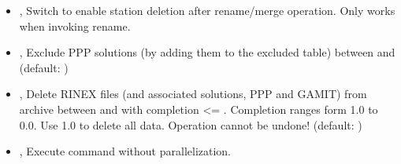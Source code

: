 \documentclass[letterpaper,10pt,english]{sphinxmanual}
\begin{document}
\begin{itemize}
\item {} 
\sphinxAtStartPar
{\hyperref[\detokenize{com:IntegrityCheck.py--del_stn}]{}}, {\hyperref[\detokenize{com:IntegrityCheck.py---delete_station}]{}} \sphinxhyphen{} Switch to enable station deletion after rename/merge operation. Only works when invoking \textendash{}rename.

\item {} 
\sphinxAtStartPar
{\hyperref[\detokenize{com:IntegrityCheck.py--es}]{}} , {\hyperref[\detokenize{com:IntegrityCheck.py---exclude_solutions}]{}}  \sphinxhyphen{} Exclude PPP solutions (by adding them to the excluded table) between  and  (default: )

\item {} 
\sphinxAtStartPar
{\hyperref[\detokenize{com:IntegrityCheck.py--del}]{}} , {\hyperref[\detokenize{com:IntegrityCheck.py---delete_rinex}]{}}  \sphinxhyphen{} Delete RINEX files (and associated solutions, PPP and GAMIT) from archive between  and  with completion \textless{}= . Completion ranges form 1.0 to 0.0. Use 1.0 to delete all data. Operation cannot be undone! (default: )

\item {} 
\sphinxAtStartPar
{\hyperref[\detokenize{com:IntegrityCheck.py--np}]{}}, {\hyperref[\detokenize{com:IntegrityCheck.py---noparallel}]{}} \sphinxhyphen{} Execute command without parallelization.

\end{itemize}
\end{document}
